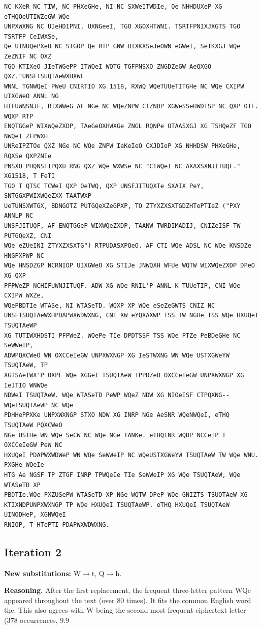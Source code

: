 \documentclass[12pt,a4paper]{article}
\begin{document}
\begin{lstlisting}[caption={Complete text after iteration 1}, label={lst:iter1}]
NC KXeR NC TIW, NC PHXeGHe, NI NC SXWeITWDIe, Qe NHHDUXeP XG eTHQOeUTIWZeGW WQe
UNPXWXNG NC UIeHDIPNI, UXNGeeI, TGO XGOXHTWNI. TSRTFPNIXJXGTS TGO TSRTFP CeIWXSe,
Qe UINUQePXeO NC STGOP Qe RTP GNW UIXKXSeJeOWN eGWeI, SeTKXGJ WQe ZeZNIF NC OXZ
TGO KTIXeO JIeTWGePP ITWQeI WQTG TGFPNSXO ZNGDZeGW AeQXGO QXZ."UNSFTSUQTAeWXHXWF
WNNL TGNWQeI PWeU CNIRTIO XG 1518, RXWQ WQeTUUeTITGHe NC WQe CXIPW UIXGWeO ANNL NG
HIFUWNSNJF, RIXWWeG AF NGe NC WQeZNPW CTZNDP XGWeSSeHWDTSP NC QXP OTF. WQXP RTP
ENQTGGeP WIXWQeZXDP, TAeGeOXHWXGe ZNGL RQNPe OTAASXGJ XG TSHQeZF TGO NWQeI ZFPWXH
UNReIPZTOe QXZ NGe NC WQe ZNPW IeKeIeO CXJDIeP XG NHHDSW PHXeGHe, RQXSe QXPZNIe
PNSXO PHQNSTIPQXU RNG QXZ WQe WXWSe NC "CTWQeI NC AXAXSXNJITUQF." XG1518, T FeTI
TGO T QTSC TCWeI QXP OeTWQ, QXP UNSFJITUQXTe SXAIX PeY, SNTGGXPWIXWQeZXX TAATWXP
UeTUNSXWTGX, BDNGOTZ PUTGQeXZeGPXP, TO ZTYXZXSXTGDZHTePTIeZ ("PXY ANNLP NC
UNSFJITUQF, AF ENQTGGeP WIXWQeZXDP, TAANW TWRDIMADIJ, CNIZeISF TW PUTGQeXZ, CNI
WQe eZUeINI ZTYXZXSXTG") RTPUDASXPQeO. AF CTI WQe ADSL NC WQe KNSDZe HNGPXPWP NC
WQe HNSDZGP NCRNIOP UIXGWeO XG STIJe JNWQXH WFUe WQTW WIXWQeZXDP DPeO XG QXP
PFPWeZP NCHIFUWNJITUQF. ADW XG WQe RNIL'P ANNL K TUUeTIP, CNI WQe CXIPW WXZe,
WQePBDTIe WTASe, NI WTASeTD. WQXP XP WQe eSeZeGWTS CNIZ NC
UNSFTSUQTAeWXHPDAPWXWDWXNG, CNI XW eYQXAXWP TSS TW NGHe TSS WQe HXUQeI TSUQTAeWP
XG TUTIWXHDSTI PFPWeZ. WQePe TIe DPDTSSF TSS WQe PTZe PeBDeGHe NC SeWWeIP,
ADWPQXCWeO WN OXCCeIeGW UNPXWXNGP XG IeSTWXNG WN WQe USTXGWeYW TSUQTAeW, TP
XGTSAeIWX'P OXPL WQe XGGeI TSUQTAeW TPPDZeO OXCCeIeGW UNPXWXNGP XG IeJTIO WNWQe
NDWeI TSUQTAeW. WQe WTASeTD PeWP WQeZ NDW XG NIOeISF CTPQXNG--WQeTSUQTAeWP NC WQe
PDHHePPXKe UNPXWXNGP STXO NDW XG INRP NGe AeSNR WQeNWQeI, eTHQ TSUQTAeW PQXCWeO
NGe USTHe WN WQe SeCW NC WQe NGe TANKe. eTHQINR WQDP NCCeIP T OXCCeIeGW PeW NC
HXUQeI PDAPWXWDWeP WN WQe SeWWeIP NC WQeUSTXGWeYW TSUQTAeW TW WQe WNU. PXGHe WQeIe
HTG Ae NGSF TP ZTGF INRP TPWQeIe TIe SeWWeIP XG WQe TSUQTAeW, WQe WTASeTD XP
PBDTIe.WQe PXZUSePW WTASeTD XP NGe WQTW DPeP WQe GNIZTS TSUQTAeW XG
KTIXNDPUNPXWXNGP TP WQe HXUQeI TSUQTAeWP. eTHQ HXUQeI TSUQTAeW UINODHeP, XGNWQeI
RNIOP, T HTePTI PDAPWXWDWXNG.
\end{lstlisting}

\clearpage
\subsection{Iteration 2}
\textbf{New substitutions:} W$\to$t, Q$\to$h.

\textbf{Reasoning.} After the first replacement, the frequent three-letter pattern WQe appeared throughout the text (over 80 times). It fits the common English word the. This also agrees with W being the second most frequent ciphertext letter (378 occurrences, 9.9%
\end{document}
